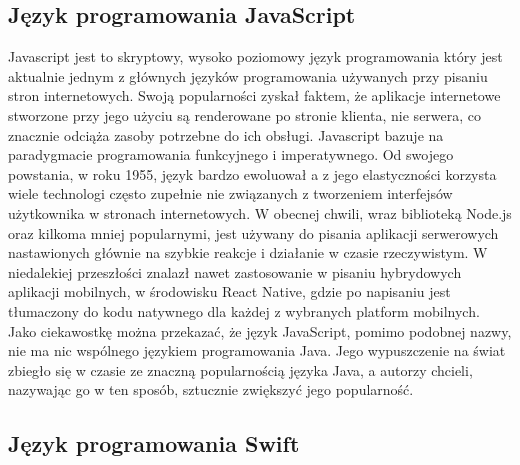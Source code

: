\subsection{Język programowania JavaScript}

Javascript jest to skryptowy, wysoko poziomowy język programowania który jest aktualnie jednym z głównych języków programowania używanych przy pisaniu stron internetowych. Swoją popularności zyskał faktem, że aplikacje internetowe stworzone przy jego użyciu są renderowane po stronie klienta, nie serwera, co znacznie odciąża zasoby potrzebne do ich obsługi. Javascript bazuje na paradygmacie programowania funkcyjnego i imperatywnego.\newline
Od swojego powstania, w roku 1955, język bardzo ewoluował a z jego elastyczności korzysta wiele technologi często zupełnie nie związanych z tworzeniem interfejsów użytkownika w stronach internetowych. W obecnej chwili, wraz biblioteką Node.js oraz kilkoma mniej popularnymi, jest używany do pisania aplikacji serwerowych nastawionych głównie na szybkie reakcje i działanie w czasie rzeczywistym. W niedalekiej przeszłości znalazł nawet zastosowanie w pisaniu hybrydowych aplikacji mobilnych, w środowisku React Native, gdzie po napisaniu jest tłumaczony do kodu natywnego dla każdej z wybranych platform mobilnych.\newline
Jako ciekawostkę można przekazać, że język JavaScript, pomimo podobnej nazwy, nie ma nic wspólnego językiem programowania Java. Jego wypuszczenie na świat zbiegło się w czasie ze znaczną popularnością języka Java, a autorzy chcieli, nazywając go w ten sposób, sztucznie zwiększyć jego popularność.

\subsection{Język programowania Swift}

